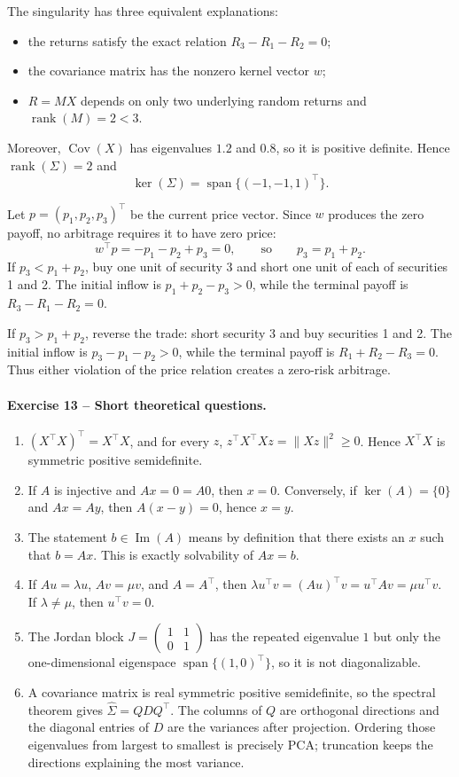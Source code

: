 \documentclass[10pt]{article}
\newcommand{\Cov}{\operatorname{Cov}}
\newcommand{\rank}{\operatorname{rank}}
\newcommand{\im}{\operatorname{Im}}
\newcommand{\Span}{\operatorname{span}}
\begin{document}
The singularity has three equivalent explanations:
\begin{itemize}
\item the returns satisfy the exact relation $R_3-R_1-R_2=0$;
\item the covariance matrix has the nonzero kernel vector $w$;
\item $R=MX$ depends on only two underlying random returns and
$\rank(M)=2<3$.
\end{itemize}
Moreover, $\Cov(X)$ has eigenvalues $1.2$ and $0.8$, so it is positive
definite. Hence $\rank(\Sigma)=2$ and
\[
\ker(\Sigma)=\Span\{(-1,-1,1)^\top\}.
\]

Let $p=(p_1,p_2,p_3)^\top$ be the current price vector. Since $w$ produces the
zero payoff, no arbitrage requires it to have zero price:
\[
w^\top p=-p_1-p_2+p_3=0,
\qquad\text{so}\qquad
\boxed{p_3=p_1+p_2}.
\]
If $p_3<p_1+p_2$, buy one unit of security 3 and short one unit of each of
securities 1 and 2. The initial inflow is $p_1+p_2-p_3>0$, while the terminal
payoff is $R_3-R_1-R_2=0$.

If $p_3>p_1+p_2$, reverse the trade: short security 3 and buy securities 1 and
2. The initial inflow is $p_3-p_1-p_2>0$, while the terminal payoff is
$R_1+R_2-R_3=0$. Thus either violation of the price relation creates a
zero-risk arbitrage.

\paragraph{Exercise 13 -- Short theoretical questions.}

\begin{enumerate}
\item $(X^\top X)^\top=X^\top X$, and for every $z$,
$z^\top X^\top Xz=\|Xz\|^2\ge0$. Hence $X^\top X$ is symmetric positive
semidefinite.
\item If $A$ is injective and $Ax=0=A0$, then $x=0$. Conversely, if
$\ker(A)=\{0\}$ and $Ax=Ay$, then $A(x-y)=0$, hence $x=y$.
\item The statement $b\in\im(A)$ means by definition that there exists an $x$
such that $b=Ax$. This is exactly solvability of $Ax=b$.
\item If $Au=\lambda u$, $Av=\mu v$, and $A=A^\top$, then
$\lambda u^\top v=(Au)^\top v=u^\top Av=\mu u^\top v$. If
$\lambda\neq\mu$, then $u^\top v=0$.
\item The Jordan block $J=\begin{pmatrix}1&1\\0&1\end{pmatrix}$ has the
repeated eigenvalue $1$ but only the one-dimensional eigenspace
$\Span\{(1,0)^\top\}$, so it is not diagonalizable.
\item A covariance matrix is real symmetric positive semidefinite, so the
spectral theorem gives $\widehat\Sigma=QDQ^\top$. The columns of $Q$ are
orthogonal directions and the diagonal entries of $D$ are the variances after
projection. Ordering those eigenvalues from largest to smallest is precisely
PCA; truncation keeps the directions explaining the most variance.
\end{enumerate}
\end{document}
